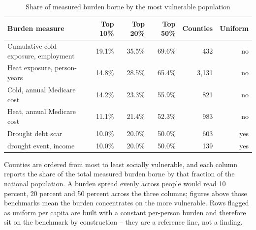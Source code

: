 \begin{table}[htbp]
\centering
\small
\setlength{\tabcolsep}{4pt}
\sloppy
\caption{Share of measured burden borne by the most vulnerable population}
\label{tab:e3t6}
\begin{tabularx}{\textwidth}{>{\raggedright\arraybackslash}X r r r r r}
\toprule
Burden measure & Top 10\% & Top 20\% & Top 50\% & Counties & Uniform \\
\midrule
Cumulative cold exposure, employment & 19.1\% & 35.5\% & 69.6\% & 432 & no \\
Heat exposure, person-years & 14.8\% & 28.5\% & 65.4\% & 3,131 & no \\
Cold, annual Medicare cost & 14.2\% & 23.3\% & 55.9\% & 821 & no \\
Heat, annual Medicare cost & 11.1\% & 21.4\% & 52.3\% & 983 & no \\
Drought debt scar & 10.0\% & 20.0\% & 50.0\% & 603 & yes \\
2012 drought event, income & 10.0\% & 20.0\% & 50.0\% & 139 & yes \\
\bottomrule
\end{tabularx}
\begin{minipage}{\textwidth}\vspace{0.5em}\footnotesize
Counties are ordered from most to least socially vulnerable, and each column reports the share of the total measured burden borne by that fraction of the national population. A burden spread evenly across people would read 10 percent, 20 percent and 50 percent across the three columns; figures above those benchmarks mean the burden concentrates on the more vulnerable. Rows flagged as uniform per capita are built with a constant per-person burden and therefore sit on the benchmark by construction -- they are a reference line, not a finding.
\end{minipage}
\end{table}
